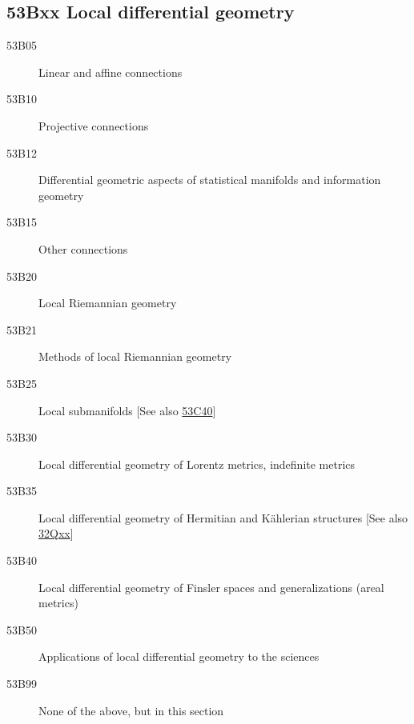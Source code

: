 \documentclass[letterpaper]{article}
\begin{document}
\subsection*{53Bxx  Local differential geometry }\label{53Bxx}
\begin{description}  
\item [53B05]\label{53B05} Linear and affine connections
\item [53B10]\label{53B10} Projective connections
\item [53B12]\label{53B12} Differential geometric aspects of statistical manifolds and information geometry
\item [53B15]\label{53B15} Other connections
\item [53B20]\label{53B20} Local Riemannian geometry
\item [53B21]\label{53B21} Methods of local Riemannian geometry
\item [53B25]\label{53B25} Local submanifolds [See also \hyperref[53C40]{53C40}]
\item [53B30]\label{53B30} Local differential geometry of Lorentz metrics, indefinite metrics
\item [53B35]\label{53B35} Local differential geometry of  Hermitian and K\"{a}hlerian structures [See also \hyperref[32Qxx]{32Qxx}]
\item [53B40]\label{53B40} Local differential geometry of  Finsler spaces and generalizations (areal metrics)
\item [53B50]\label{53B50} Applications of local differential geometry to the sciences
\item [53B99]\label{53B99} None of the above, but in this section
\end{description}
\end{document}

